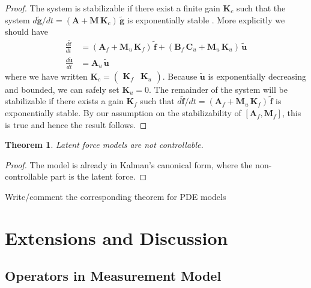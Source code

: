 \documentclass[journal]{IEEEtran}
\newtheorem{theorem}{Theorem}[section]
\newcommand{\simo}[1]{{\color{red}#1}}
\begin{document}
\begin{proof}
The system is stabilizable if there exist a finite gain $\mathbf{K}_c$ such that the system $d\tilde{\mathbf{g}}/dt = (\mathbf{A} + \mathbf{M} \, \mathbf{K}_c) \, \tilde{\mathbf{g}}$ is exponentially stable \cite{Wonham:1985}. More explicitly we should have
%
\begin{equation}
\begin{split}
  \frac{d\tilde{\mathbf{f}}}{dt} &= (\mathbf{A}_f + \mathbf{M}_u \, \mathbf{K}_f) \, \tilde{\mathbf{f}}
  + (\mathbf{B}_f \, \mathbf{C}_u + \mathbf{M}_u \, \mathbf{K}_u) \, \tilde{\mathbf{u}} \\
  \frac{d\tilde{\mathbf{u}}}{dt} &= \mathbf{A}_u \, \tilde{\mathbf{u}}
\end{split}
\end{equation}
%
where we have written $\mathbf{K}_c = \begin{pmatrix} \mathbf{K}_f & \mathbf{K}_u \end{pmatrix}$. Because $\tilde{\mathbf{u}}$ is exponentially decreasing and bounded, we can safely set $\mathbf{K}_u = 0$. The remainder of the system will be stabilizable if there exists a gain $\mathbf{K}_f$ such that $d\tilde{\mathbf{f}}/dt = (\mathbf{A}_f + \mathbf{M}_u \, \mathbf{K}_f) \, \tilde{\mathbf{f}}$ is exponentially stable. By our assumption on the stabilizability of $[\mathbf{A}_f,\mathbf{M}_f]$, this is true and hence the result follows.
\end{proof}

\begin{theorem}
  Latent force models are not controllable.
\end{theorem}

\begin{proof}
  \simo{The model is already in Kalman's canonical form, where the non-controllable part is the latent force.}
\end{proof}

\simo{Write/comment the corresponding theorem for PDE models}


\section{Extensions and Discussion}

\subsection{Operators in Measurement Model}
\end{document}
